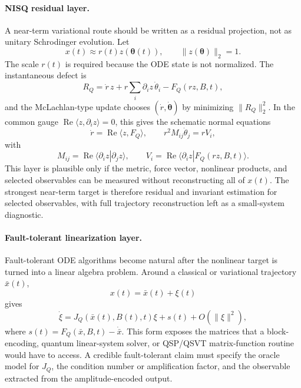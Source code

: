 \documentclass[
  reprint,
  amsmath,
  amssymb,
  aps,
  pra,
  nofootinbib,
  superscriptaddress,
  floatfix
]{revtex4-2}
\begin{document}
\paragraph*{NISQ residual layer.}
A near-term variational route should be written as a residual projection, not
as unitary Schrodinger evolution.  Let
\begin{equation}
x(t)\approx r(t)z(\bm\theta(t)),
\qquad
\|z(\bm\theta)\|_2=1 .
\end{equation}
The scale \(r(t)\) is required because the ODE state is not normalized.  The
instantaneous defect is
\begin{equation}
R_Q=
\dot r\,z
+r\sum_i\partial_i z\,\dot\theta_i
-F_Q(rz,B,t),
\end{equation}
and the McLachlan-type update chooses \((\dot r,\dot{\bm\theta})\) by minimizing
\(\|R_Q\|_2^2\).  In the common gauge
\(\operatorname{Re}\langle z,\partial_i z\rangle=0\), this gives the schematic
normal equations
\begin{equation}
\dot r=\operatorname{Re}\langle z,F_Q\rangle,
\qquad
r^2 M_{ij}\dot\theta_j
=r V_i ,
\end{equation}
with
\begin{equation}
M_{ij}=\operatorname{Re}\langle\partial_i z|\partial_jz\rangle,
\qquad
V_i=\operatorname{Re}\langle\partial_i z|F_Q(rz,B,t)\rangle .
\end{equation}
This layer is plausible only if the metric, force vector, nonlinear products,
and selected observables can be measured without reconstructing all of
\(x(t)\).  The strongest near-term target is therefore residual and invariant
estimation for selected observables, with full trajectory reconstruction left
as a small-system diagnostic.

\paragraph*{Fault-tolerant linearization layer.}
Fault-tolerant ODE algorithms become natural after the nonlinear target is
turned into a linear algebra problem.  Around a classical or variational
trajectory \(\bar x(t)\),
\begin{equation}
x(t)=\bar x(t)+\xi(t)
\end{equation}
gives
\begin{equation}
\dot\xi
=J_Q(\bar x(t),B(t),t)\xi+s(t)+O(\|\xi\|^2),
\end{equation}
where \(s(t)=F_Q(\bar x,B,t)-\dot{\bar x}\).  This form exposes the matrices
that a block-encoding, quantum linear-system solver, or QSP/QSVT matrix-function
routine would have to access.  A credible fault-tolerant claim must specify the
oracle model for \(J_Q\), the condition number or amplification factor, and the
observable extracted from the amplitude-encoded output.
\end{document}
